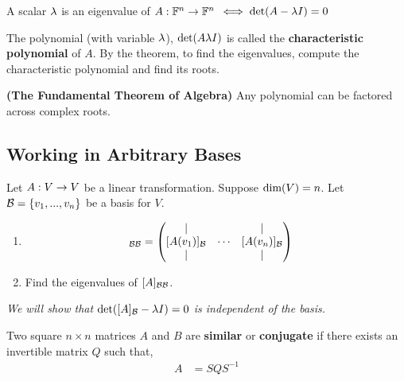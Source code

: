 \begin{thm}
    A scalar $\lambda$ is an eigenvalue of $A : \mathbb{F}^n \rightarrow \mathbb{F}^n$ $\iff \text{det}(A - \lambda I) = 0$
\end{thm}

\begin{definition}
    The polynomial (with variable $\lambda$), $\text{det}(A \lambda I)$ is called the \textbf{characteristic polynomial} of $A$.
    By the theorem, to find the eigenvalues, compute the characteristic polynomial and find its roots.
\end{definition}

\begin{thm} \textbf{(The Fundamental Theorem of Algebra)}
    Any polynomial can be factored across complex roots.
\end{thm}

\subsection{Working in Arbitrary Bases}

\begin{setup}
    Let $A : V \rightarrow V$ be a linear transformation. Suppose $\text{dim}(V) = n$. Let $\mathcal{B} = \{ v_1, ..., v_n \}$ be a basis for $V$.
    \begin{enumerate}
        \item 
        \begin{align*}
            [A]_{\cB \cB} &= 
            \begin{pmatrix}
                | & & | \\
                [A(v_1)]_{\cB} & \cdots & [A(v_n)]_{\cB} \\
                | & & |
            \end{pmatrix}
        \end{align*}
        \item Find the eigenvalues of $[A]_{\mathcal{B} \mathcal{B}}$.
    \end{enumerate}

    \emph{We will show that $\text{det} ([A]_{\mathcal{B}} - \lambda I) = 0$ is independent of the basis.}
\end{setup}

\begin{definition}
    Two square $n \times n$ matrices $A$ and $B$ are \textbf{similar} or \textbf{conjugate} if there exists an invertible matrix $Q$ such that,
    \begin{align*}
        A &= S Q S^{-1}
    \end{align*}
\end{definition}


